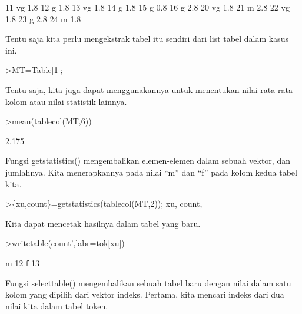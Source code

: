 \documentclass{article}
\begin{document}
\begin{eulernotebook}
\begin{euleroutput}
          11         vg       1.8
          12          g       1.8
          13         vg       1.8
          14          g       1.8
          15          g       0.8
          16          g       2.8
          20         vg       1.8
          21          m       2.8
          22         vg       1.8
          23          g       2.8
          24          m       1.8
\end{euleroutput}
\begin{eulercomment}
Tentu saja kita perlu mengekstrak tabel itu sendiri dari list tabel
dalam kasus ini.
\end{eulercomment}
\begin{eulerprompt}
>MT=Table[1];
\end{eulerprompt}
\begin{eulercomment}
Tentu saja, kita juga dapat menggunakannya untuk menentukan nilai
rata-rata kolom atau nilai statistik lainnya.
\end{eulercomment}
\begin{eulerprompt}
>mean(tablecol(MT,6))
\end{eulerprompt}
\begin{euleroutput}
  2.175
\end{euleroutput}
\begin{eulercomment}
Fungsi getstatistics() mengembalikan elemen-elemen dalam sebuah
vektor, dan jumlahnya. Kita menerapkannya pada nilai “m” dan “f” pada
kolom kedua tabel kita.
\end{eulercomment}
\begin{eulerprompt}
>\{xu,count\}=getstatistics(tablecol(MT,2)); xu, count,
\end{eulerprompt}
\begin{euleroutput}
  [1,  3]
  [12,  13]
\end{euleroutput}
\begin{eulercomment}
Kita dapat mencetak hasilnya dalam tabel yang baru.
\end{eulercomment}
\begin{eulerprompt}
>writetable(count',labr=tok[xu])
\end{eulerprompt}
\begin{euleroutput}
           m        12
           f        13
\end{euleroutput}
\begin{eulercomment}
Fungsi selecttable() mengembalikan sebuah tabel baru dengan nilai
dalam satu kolom yang dipilih dari vektor indeks. Pertama, kita
mencari indeks dari dua nilai kita dalam tabel token.
\end{eulercomment}

\end{eulernotebook}
\end{document}
